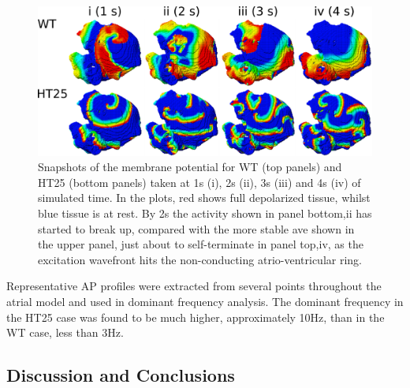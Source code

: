 \begin{figure}
\includegraphics{figures/atrium/iks/3D_Fig}
\caption[Snapshots of membrane potential over the whole atrium with S140G
mutation]{
\label{atrium:iks:threed}
Snapshots of the membrane potential for WT (top panels) and HT25 (bottom
panels) taken at \unit{1}{s} (i), \unit{2}{s} (ii), \unit{3}{s} (iii) and
\unit{4}{s} (iv) of simulated time.
In the plots, red shows full depolarized tissue, whilst blue tissue is at rest.
By \unit{2}{s} the activity shown in panel bottom,ii has started to break up, compared with
the more stable ave shown in the upper panel, just about to self-terminate in
panel top,iv, as the excitation wavefront hits the non-conducting atrio-ventricular
ring.
}
\end{figure}

Representative AP profiles were extracted from several points throughout the
atrial model and used in dominant frequency analysis.
The dominant frequency in the HT25 case was found to be much higher,
approximately \unit{10}{Hz}, than in the WT case, less than \unit{3}{Hz}.

\subsection{Discussion and Conclusions}

